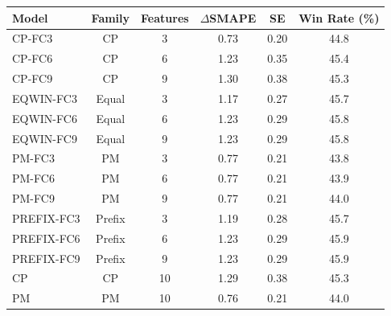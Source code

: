 \begin{tabular}{|l|c|c|c|c|c|}
\hline
Model & Family & Features & $\Delta$SMAPE & SE & Win Rate (\%) \\
\hline
CP-FC3 & CP & 3 & 0.73 & 0.20 & 44.8 \\
CP-FC6 & CP & 6 & 1.23 & 0.35 & 45.4 \\
CP-FC9 & CP & 9 & 1.30 & 0.38 & 45.3 \\
EQWIN-FC3 & Equal & 3 & 1.17 & 0.27 & 45.7 \\
EQWIN-FC6 & Equal & 6 & 1.23 & 0.29 & 45.8 \\
EQWIN-FC9 & Equal & 9 & 1.23 & 0.29 & 45.8 \\
PM-FC3 & PM & 3 & 0.77 & 0.21 & 43.8 \\
PM-FC6 & PM & 6 & 0.77 & 0.21 & 43.9 \\
PM-FC9 & PM & 9 & 0.77 & 0.21 & 44.0 \\
PREFIX-FC3 & Prefix & 3 & 1.19 & 0.28 & 45.7 \\
PREFIX-FC6 & Prefix & 6 & 1.23 & 0.29 & 45.9 \\
PREFIX-FC9 & Prefix & 9 & 1.23 & 0.29 & 45.9 \\
CP & CP & 10 & 1.29 & 0.38 & 45.3 \\
PM & PM & 10 & 0.76 & 0.21 & 44.0 \\
\hline
\end{tabular}